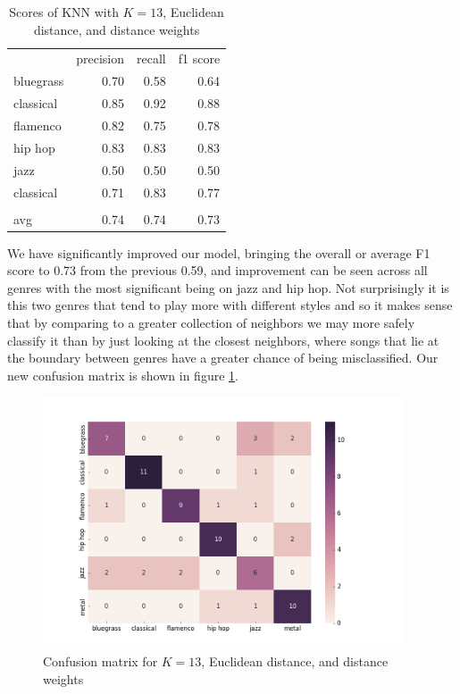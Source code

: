 \documentclass[12pt]{article}
\begin{document}
\begin{table}[]
\centering
\begin{tabular}{lrrr}
          & precision & recall & f1 score \\
bluegrass & 0.70      & 0.58   & 0.64     \\
classical & 0.85      & 0.92   & 0.88     \\
flamenco  & 0.82      & 0.75   & 0.78     \\
hip hop   & 0.83      & 0.83   & 0.83     \\
jazz      & 0.50      & 0.50   & 0.50     \\
classical & 0.71      & 0.83   & 0.77     \\
          &           &        &          \\
avg       & 0.74      & 0.74   & 0.73    
\end{tabular}
\caption{Scores of KNN with $K=13$, Euclidean distance, and distance weights}
\label{gsKNN_t}
\end{table}
\medskip

We have significantly improved our model, bringing the overall or average F1 score to 0.73 from the previous 0.59, and improvement can be seen across all genres with the most significant being on jazz and hip hop. Not surprisingly it is this two genres that tend to play more with different styles and so it makes sense that by comparing to a greater collection of neighbors we may more safely classify it than by just looking at the closest neighbors, where songs that lie at the boundary between genres have a greater chance of being misclassified. Our new confusion matrix is shown in figure \ref{gsKNN}.
\begin{figure}
\centering
  \includegraphics[width=0.95\textwidth]{gsKNN.png}
  \caption{Confusion matrix for $K=13$, Euclidean distance, and distance weights}
  \label{gsKNN}
\end{figure}
\medskip
\end{document}
